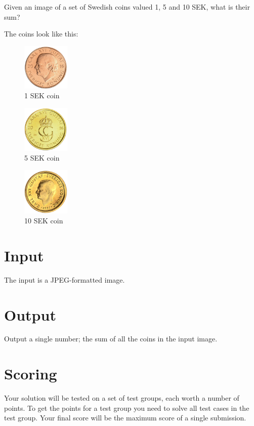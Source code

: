 Given an image of a set of Swedish coins valued 1, 5 and 10 SEK, what is their sum?

The coins look like this:
\begin{figure}[h]
  \centering
  \includegraphics[width=0.2\textwidth]{1.png}
  \caption{1 SEK coin}
\end{figure}
\begin{figure}[h]
  \centering
  \includegraphics[width=0.2\textwidth]{5.png}
  \caption{5 SEK coin}
\end{figure}
\begin{figure}[h]
  \centering
  \includegraphics[width=0.2\textwidth]{10.png}
  \caption{10 SEK coin}
\end{figure}

\section*{Input}
The input is a JPEG-formatted image.

\section*{Output}
Output a single number; the sum of all the coins in the input image.

\section*{Scoring}
Your solution will be tested on a set of test groups, each worth a number of points.
To get the points for a test group you need to solve all test cases in the test group.
Your final score will be the maximum score of a single submission.

